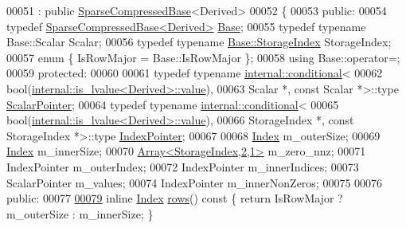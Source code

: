 \begin{DoxyCode}
00051   : \textcolor{keyword}{public} \hyperlink{group___sparse_core___module_class_eigen_1_1_sparse_compressed_base}{SparseCompressedBase}<Derived>
00052 \{
00053   \textcolor{keyword}{public}:
00054     \textcolor{keyword}{typedef} \hyperlink{group___sparse_core___module_class_eigen_1_1_sparse_compressed_base}{SparseCompressedBase<Derived>} \hyperlink{group___sparse_core___module_class_eigen_1_1_sparse_matrix_base}{Base};
00055     \textcolor{keyword}{typedef} \textcolor{keyword}{typename} Base::Scalar Scalar;
00056     \textcolor{keyword}{typedef} \textcolor{keyword}{typename} \hyperlink{group___sparse_core___module_a0b540ba724726ebe953f8c0df06081ed}{Base::StorageIndex} StorageIndex;
00057     \textcolor{keyword}{enum} \{ IsRowMajor = Base::IsRowMajor \};
00058     \textcolor{keyword}{using} Base::operator=;
00059   \textcolor{keyword}{protected}:
00060     
00061     \textcolor{keyword}{typedef} \textcolor{keyword}{typename} \hyperlink{struct_eigen_1_1internal_1_1conditional}{internal::conditional}<
00062                          bool(\hyperlink{struct_eigen_1_1internal_1_1is__lvalue}{internal::is\_lvalue<Derived>::value}),
00063                          Scalar *, \textcolor{keyword}{const} Scalar *>::type \hyperlink{class_eigen_1_1internal_1_1_tensor_lazy_evaluator_writable}{ScalarPointer};
00064     \textcolor{keyword}{typedef} \textcolor{keyword}{typename} \hyperlink{struct_eigen_1_1internal_1_1conditional}{internal::conditional}<
00065                          bool(\hyperlink{struct_eigen_1_1internal_1_1is__lvalue}{internal::is\_lvalue<Derived>::value}),
00066                          StorageIndex *, \textcolor{keyword}{const} StorageIndex *>::type 
      \hyperlink{class_eigen_1_1internal_1_1_tensor_lazy_evaluator_writable}{IndexPointer};
00067 
00068     \hyperlink{group___core___module_a554f30542cc2316add4b1ea0a492ff02}{Index}   m\_outerSize;
00069     \hyperlink{group___core___module_a554f30542cc2316add4b1ea0a492ff02}{Index}   m\_innerSize;
00070     \hyperlink{group___core___module}{Array<StorageIndex,2,1>}  m\_zero\_nnz;
00071     IndexPointer  m\_outerIndex;
00072     IndexPointer  m\_innerIndices;
00073     ScalarPointer m\_values;
00074     IndexPointer  m\_innerNonZeros;
00075 
00076   \textcolor{keyword}{public}:
00077 
\hyperlink{group___sparse_core___module_a3cdd6cab0abd7ac01925a695fc315d34}{00079}     \textcolor{keyword}{inline} \hyperlink{group___core___module_a554f30542cc2316add4b1ea0a492ff02}{Index} \hyperlink{group___sparse_core___module_a3cdd6cab0abd7ac01925a695fc315d34}{rows}()\textcolor{keyword}{ const }\{ \textcolor{keywordflow}{return} IsRowMajor ? m\_outerSize : m\_innerSize; \}

\end{DoxyCode}
